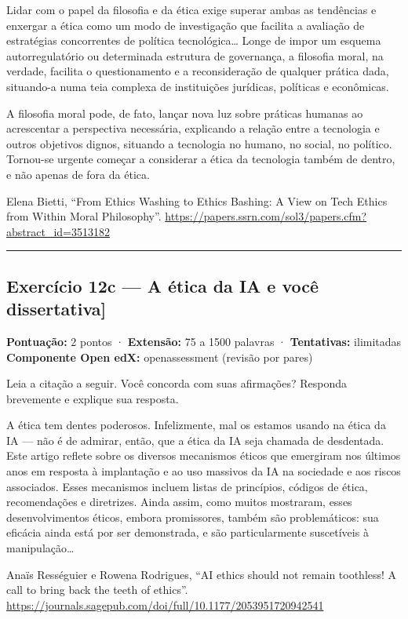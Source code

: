 \documentclass[
  11pt,
]{article}
\renewcommand{\texttt}[1]{{\color{iaAmeixa}\small\ttfamily #1}}
\renewenvironment{quote}
  {\begin{tcolorbox}[
      breakable, enhanced jigsaw, rounded corners,
      arc=3pt, boxrule=0pt, frame hidden,
      colback=iaCaso,
      borderline west={3pt}{0pt}{iaRiscos},
      left=12pt, right=10pt, top=9pt, bottom=9pt,
      before skip=9pt, after skip=9pt]}
  {\end{tcolorbox}}
\begin{document}
\begin{quote}
Lidar com o papel da filosofia e da ética exige superar ambas as
tendências e enxergar a ética como um modo de investigação que facilita
a avaliação de estratégias concorrentes de política tecnológica\ldots{}
Longe de impor um esquema autorregulatório ou determinada estrutura de
governança, a filosofia moral, na verdade, facilita o questionamento e a
reconsideração de qualquer prática dada, situando-a numa teia complexa
de instituições jurídicas, políticas e econômicas.

A filosofia moral pode, de fato, lançar nova luz sobre práticas humanas
ao acrescentar a perspectiva necessária, explicando a relação entre a
tecnologia e outros objetivos dignos, situando a tecnologia no humano,
no social, no político. Tornou-se urgente começar a considerar a ética
da tecnologia também de dentro, e não apenas de fora da ética.

Elena Bietti, ``From Ethics Washing to Ethics Bashing: A View on Tech
Ethics from Within Moral Philosophy''.
\url{https://papers.ssrn.com/sol3/papers.cfm?abstract_id=3513182}
\end{quote}

\begin{center}\rule{0.5\linewidth}{0.5pt}\end{center}

\hypertarget{exercuxedcio-12c-a-uxe9tica-da-ia-e-vocuxea-dissertativa}{%
\subsection{\texorpdfstring{Exercício 12c --- A ética da IA e você
\texttt{{[}dissertativa{]}}}{Exercício 12c --- A ética da IA e você {[}dissertativa{]}}}\label{exercuxedcio-12c-a-uxe9tica-da-ia-e-vocuxea-dissertativa}}

\textbf{Pontuação:} 2 pontos · \textbf{Extensão:} 75 a 1500 palavras ·
\textbf{Tentativas:} ilimitadas \textbf{Componente Open edX:}
\texttt{openassessment} (revisão por pares)

Leia a citação a seguir. Você concorda com suas afirmações? Responda
brevemente e explique sua resposta.

\begin{quote}
A ética tem dentes poderosos. Infelizmente, mal os estamos usando na
ética da IA --- não é de admirar, então, que a ética da IA seja chamada
de desdentada. Este artigo reflete sobre os diversos mecanismos éticos
que emergiram nos últimos anos em resposta à implantação e ao uso
massivos da IA na sociedade e aos riscos associados. Esses mecanismos
incluem listas de princípios, códigos de ética, recomendações e
diretrizes. Ainda assim, como muitos mostraram, esses desenvolvimentos
éticos, embora promissores, também são problemáticos: sua eficácia ainda
está por ser demonstrada, e são particularmente suscetíveis à
manipulação\ldots{}

Anaïs Rességuier e Rowena Rodrigues, ``AI ethics should not remain
toothless! A call to bring back the teeth of ethics''.
\url{https://journals.sagepub.com/doi/full/10.1177/2053951720942541}
\end{quote}
\end{document}
